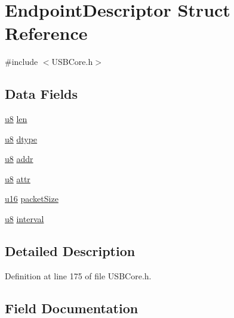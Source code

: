 \hypertarget{struct_endpoint_descriptor}{}\section{Endpoint\+Descriptor Struct Reference}
\label{struct_endpoint_descriptor}


{\ttfamily \#include $<$U\+S\+B\+Core.\+h$>$}

\subsection*{Data Fields}
\begin{DoxyCompactItemize}
\item 
\hyperlink{_u_s_b_a_p_i_8h_aed742c436da53c1080638ce6ef7d13de}{u8} \hyperlink{struct_endpoint_descriptor_afbf3f3230446569534d5f466aaf4c23b}{len}
\item 
\hyperlink{_u_s_b_a_p_i_8h_aed742c436da53c1080638ce6ef7d13de}{u8} \hyperlink{struct_endpoint_descriptor_a0bb419531ec75697e63e9109fecf81b0}{dtype}
\item 
\hyperlink{_u_s_b_a_p_i_8h_aed742c436da53c1080638ce6ef7d13de}{u8} \hyperlink{struct_endpoint_descriptor_a7394c0f7cac587defeae4e84d34fb535}{addr}
\item 
\hyperlink{_u_s_b_a_p_i_8h_aed742c436da53c1080638ce6ef7d13de}{u8} \hyperlink{struct_endpoint_descriptor_a76705b0f72861d4d0bef909f56fb34ec}{attr}
\item 
\hyperlink{_u_s_b_a_p_i_8h_a9e6c91d77e24643b888dbd1a1a590054}{u16} \hyperlink{struct_endpoint_descriptor_a198c21ff91822a72041d63f054615143}{packet\+Size}
\item 
\hyperlink{_u_s_b_a_p_i_8h_aed742c436da53c1080638ce6ef7d13de}{u8} \hyperlink{struct_endpoint_descriptor_a10a5b8a25e61bd366aeabe4da95b2cf2}{interval}
\end{DoxyCompactItemize}


\subsection{Detailed Description}


Definition at line 175 of file U\+S\+B\+Core.\+h.



\subsection{Field Documentation}
\hypertarget{struct_endpoint_descriptor_a7394c0f7cac587defeae4e84d34fb535}{}

